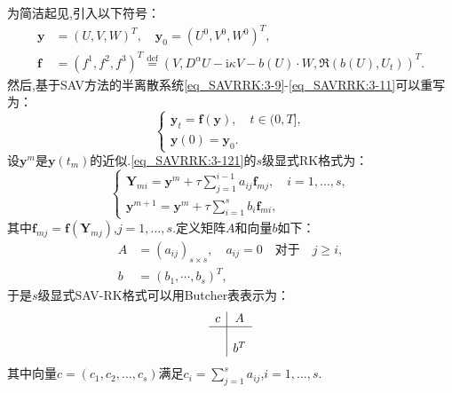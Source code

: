 为简洁起见,引入以下符号：
\begin{equation}
	\begin{aligned}
		\bm{y}&=\left(U,V,W\right)^T,\quad\bm{y}_0=\left(U^0,V^0,W^0\right)^T , \\
		\bm{f}&=(f^1,f^2,f^3)^T\overset{\text{def}}{=}(V,D^{\alpha} U-\mathrm{i}\kappa V-b(U)\cdot W,\Re\left(b(U), U_t\right))^T.
	\end{aligned}
\end{equation}
然后,基于SAV方法的半离散系统\eqref{eq_SAVRRK:3-9}-\eqref{eq_SAVRRK:3-11}可以重写为：
\begin{equation}
\left\{\begin{array}{l}
\bm{y}_t=\bm{f}(\bm{y}),\quad t \in(0, T],\\
\bm{y}(0)=\bm{y}_0.
\end{array}\right.\label{eq_SAVRRK:3-121}
\end{equation}
设$\bm{y}^m$是$\bm{y}\left(t_m\right)$的近似.\eqref{eq_SAVRRK:3-121}的$s$级显式RK格式\cite{hairerRungeKuttaMethods2015}为：
\begin{equation}
\left\{\begin{array}{l}
\bm{Y}_{m i}=\bm{y}^m+\tau \sum\limits_{j=1}^{i-1} a_{i j} \bm{f}_{m j}, \quad i=1, \ldots, s, \\
\bm{y}^{m+1}=\bm{y}^m+\tau \sum\limits_{i=1}^s b_i \bm{f}_{m i},
\end{array}\right.\label{eq_SAVRRK:4-31}
\end{equation}
其中$\bm{f}_{m j}=\bm{f}\left(\bm{Y}_{m j}\right)$,$j=1, \ldots, s$.定义矩阵$A$和向量$b$如下：
\begin{equation}
\begin{aligned}
A & =\left(a_{i j}\right)_{s \times s}, \quad a_{i j}=0 \quad \text {对于} \quad j \geq i, \\
b & =\left(b_1, \cdots, b_s\right)^T,
\end{aligned}
\end{equation}
于是$s$级显式SAV-RK格式可以用Butcher表表示为：
\begin{equation}
\begin{array}{c|c}
c & A \\
\hline \\
& b^T
\end{array}
\end{equation}
其中向量$c=(c_1,c_2,\dots,c_s)$满足$c_i=\sum\limits_{j=1}^s a_{i j}$,$i=1, \ldots, s$.

